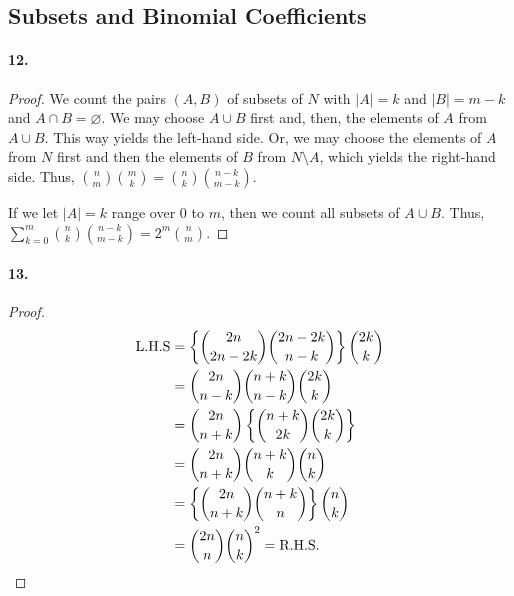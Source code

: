 \subsection{Subsets and Binomial Coefficients}
  \paragraph{12.}
  \begin{proof}
    We count the pairs $(A,B)$ of subsets of $N$ with $|A|=k$ and $|B|=m-k$ and
    $A\cap B=\varnothing$. We may choose $A\cup B$ first and, then, the 
    elements of $A$ from $A\cup B$. This way yields the left-hand side. Or,
    we may choose the elements of $A$ from $N$ first and then the elements of
    $B$ from $N\setminus A$, which yields the right-hand side. Thus, $\binom{n}
    {m}\binom{m}{k}=\binom{n}{k}\binom{n-k}{m-k}$.\par
    If we let $|A|=k$ range over $0$ to $m$, then we count all subsets of $A
    \cup B$. Thus, $\sum_{k=0}^m\binom{n}{k}\binom{n-k}{m-k}=2^m\binom{n}{m}$.
  \end{proof}
  
  \paragraph{13.}
  \begin{proof}
    \begin{align*}
      \text{L.H.S}
      &=\left\{\binom{2n}{2n-2k}\binom{2n-2k}{n-k}\right\}\binom{2k}{k}\\
      &=\binom{2n}{n-k}\binom{n+k}{n-k}\binom{2k}{k}\\
      &=\binom{2n}{n+k}\left\{\binom{n+k}{2k}\binom{2k}{k}\right\}\\
      &=\binom{2n}{n+k}\binom{n+k}{k}\binom{n}{k}\\
      &=\left\{\binom{2n}{n+k}\binom{n+k}{n}\right\}\binom{n}{k}\\
      &=\binom{2n}{n}\binom{n}{k}^2 =\text{R.H.S}.
    \end{align*}
  \end{proof}
  
